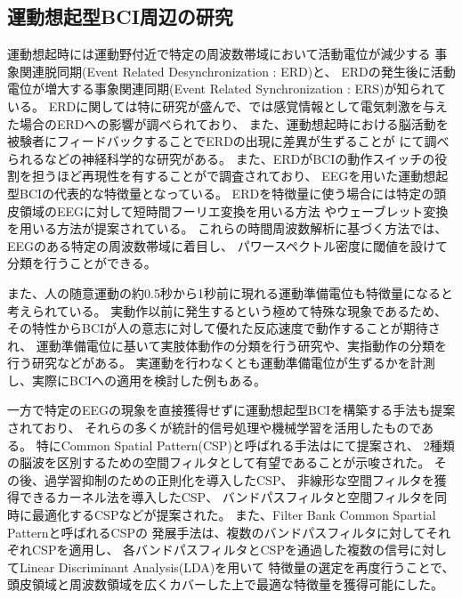\subsection{\mc 運動想起型\rm BCI\mc 周辺の研究}
\label{MIBCIの周辺}
運動想起時には運動野付近で特定の周波数帯域において活動電位が減少する
事象関連脱同期(Event Related Desynchronization : ERD)と、
ERDの発生後に活動電位が増大する事象関連同期(Event Related Synchronization : ERS)が知られている\cite{ERDとERS}。
ERDに関しては特に研究が盛んで、\cite{ERDリハビリ}では感覚情報として電気刺激を与えた場合のERDへの影響が調べられており、
また、運動想起時における脳活動を被験者にフィードバックすることでERDの出現に差異が生ずることが\cite{運動フィードバック}
にて調べられるなどの神経科学的な研究がある。
また、ERDがBCIの動作スイッチの役割を担うほど再現性を有することが\cite{Beta波によるBCI}で調査されており、
EEGを用いた運動想起型BCIの代表的な特徴量となっている。
ERDを特徴量に使う場合には特定の頭皮領域のEEGに対して短時間フーリエ変換を用いる方法
\cite{プリミティブERD}やウェーブレット変換を用いる方法\cite{waveletFSVM}が提案されている。
これらの時間周波数解析に基づく方法では、EEGのある特定の周波数帯域に着目し、
パワースペクトル密度に閾値を設けて分類を行うことができる。

また、人の随意運動の約0.5秒から1秒前に現れる運動準備電位も特徴量になると考えられている。
実動作以前に発生するという極めて特殊な現象であるため、
その特性からBCIが人の意志に対して優れた反応速度で動作することが期待され、
運動準備電位に基いて実肢体動作の分類を行う研究\cite{運動準備電位肢体}や、実指動作の分類を行う研究\cite{運動準備電位指}などがある。
実運動を行わなくとも運動準備電位が生ずるかを計測し\cite{運動準備電位想起}、実際にBCIへの適用を検討した例\cite{運動準備電位想起2}もある。

一方で特定のEEGの現象を直接獲得せずに運動想起型BCIを構築する手法も提案されており、
それらの多くが統計的信号処理や機械学習を活用したものである。
特にCommon Spatial Pattern(CSP)と呼ばれる手法は\cite{CSP1990}にて提案され、
2種類の脳波を区別するための空間フィルタとして有望であることが示唆された。
その後、過学習抑制のための正則化を導入したCSP\cite{正則化CSP}、
非線形な空間フィルタを獲得できるカーネル法を導入したCSP\cite{カーネルCSP}、
バンドパスフィルタと空間フィルタを同時に最適化するCSP\cite{csssp}などが提案された。
また、Filter Bank Common Spartial Pattern\cite{fbcsp}と呼ばれるCSPの
発展手法は、複数のバンドパスフィルタに対してそれぞれCSPを適用し、
各バンドパスフィルタとCSPを通過した複数の信号に対してLinear Discriminant Analysis(LDA)を用いて
特徴量の選定を再度行うことで、
頭皮領域と周波数領域を広くカバーした上で最適な特徴量を獲得可能にした。

